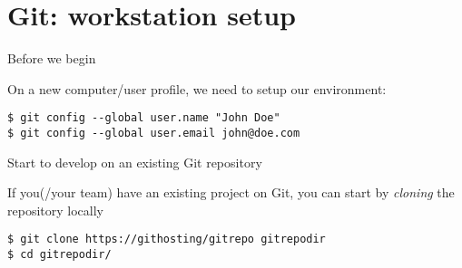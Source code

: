 

\section{Git: workstation setup}

\begin{frame}[c,fragile]{Before we begin}

On a new computer/user profile, we need to setup our environment:

\begin{center}
\begin{minipage}{\textwidth}

\begin{listing}[H]
\begin{verbatim}
$ git config --global user.name "John Doe"
$ git config --global user.email john@doe.com
\end{verbatim}
\end{listing}

\end{minipage}
\end{center}

\end{frame}


\begin{frame}[c,fragile]{Start to develop on an existing Git repository}

If you(/your team) have an existing project on Git, you can start by \textit{cloning}
the repository locally

\begin{center}
\begin{minipage}{\textwidth}

\begin{listing}[H]
\begin{verbatim}
$ git clone https://githosting/gitrepo gitrepodir
$ cd gitrepodir/
\end{verbatim}
\end{listing}

\end{minipage}
\end{center}

\end{frame}


